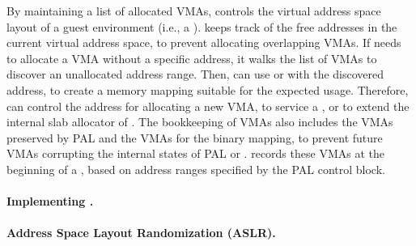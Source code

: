 By maintaining a list of allocated VMAs,
\thelibos{} controls the virtual address space layout
of a guest environment (i.e., a \picoproc{}).
\thelibos{} keeps track of the free addresses in the current virtual address space,
to prevent allocating overlapping VMAs.
If \thelibos{} needs to allocate a VMA without a specific address,
it walks the list of VMAs
to discover an unallocated address range.
Then, \thelibos{} can use  or  with the discovered address,
to create a memory mapping suitable for the expected usage.
Therefore, \thelibos{} can control the address
for allocating a new VMA,
to service a  \linuxapi{},
or to extend the internal slab allocator of \thelibos{}.
The bookkeeping of VMAs also includes
the VMAs preserved by PAL and the VMAs for the \thelibos{} binary mapping,
to prevent future VMAs
corrupting the internal states of PAL or \thelibos{}.
\thelibos{} records these VMAs at the beginning of a \picoproc{}, based on address ranges specified by the PAL control block.





\paragraph{Implementing .}





\paragraph{Address Space Layout Randomization (ASLR).}

